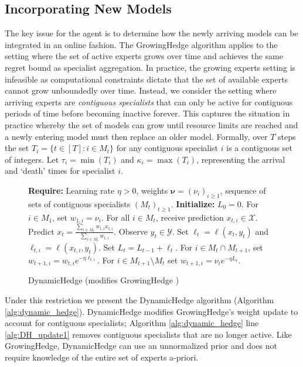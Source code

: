 \documentclass[letterpaper]{article} %
\theoremstyle{definition}
\begin{document}
\subsection{Incorporating New Models}
The key issue for the agent is to determine how the newly arriving models can be integrated in an online fashion.
The GrowingHedge algorithm \cite{MM17:growing_expert} applies to the setting where the set of active experts grows over time and achieves the same regret bound as specialist aggregation. 
In practice, the growing experts setting is infeasible as computational constraints dictate that the set of available experts cannot grow unboundedly over time. Instead, we consider the setting where arriving experts are \textit{contiguous specialists} that
can only be active for contiguous periods of time before becoming inactive forever. 
This captures the situation in practice whereby the set of models can grow until resource limits are reached and a newly entering model must then replace an older model.
Formally, over $T$ steps the set $T_i = \{t \in [T]: i \in M_t\}$ for any contiguous specialist $i$ is a contiguous set of integers. Let $\tau_i = \min(T_i)$ and $\kappa_i = \max(T_i)$, representing the arrival and `death' times for specialist $i$. 


\begin{figure}[t]
\begin{algorithm}[H]
\caption{DynamicHedge (modifies GrowingHedge \cite{MM17:growing_expert})}\label{alg:dynamic_hedge}
\begin{algorithmic}[1]
\State \textbf{Require:} Learning rate $\eta > 0$, weights $\bm{\nu} = (\nu_i)_{i \geq 1}$, sequence of sets of contiguous specialists $(M_t)_{t \geq 1}$.
\State \textbf{Initialize:} $L_0 = 0$. For $i \in M_1$, set $w_{1, i} = \nu_i$.
\State For all ${i \in M_t}$, receive prediction $x_{t, i} \in \mathcal{X}$.
\State Predict
   $ x_t = \frac{ \sum_{i \in M_t} w_{t, i} x_{t, i} }{ \sum_{i \in M_t} w_{t, i} }$.
\State Observe $y_t \in \mathcal{Y}$.
\State Set $\ell_t = \ell(x_t, y_t)$ and $\ell_{t, i} = \ell(x_{t, i}, y_t)$.
\State Set $L_t = L_{t-1} + \ell_t$.
\State For $i \in M_t \cap M_{t+1}$, set $w_{t+1, i} = w_{t, i} e^{-\eta \ell_{t, i}}$. \label{alg:DH_update1}
\State For $i \in M_{t+1} \setminus M_t$ set $w_{t+1, i} = \nu_i e^{-\eta L_t}$. \label{alg:DH_update2} %
\EndFor
\end{algorithmic}
\end{algorithm}
\end{figure}
Under this restriction we present the DynamicHedge algorithm (Algorithm \ref{alg:dynamic_hedge}).
DynamicHedge modifies GrowingHedge's weight update to account for contiguous specialists; Algorithm \ref{alg:dynamic_hedge} line \ref{alg:DH_update1} removes contiguous specialists that are no longer active.
Like GrowingHedge, DynamicHedge can use an unnormalized prior and does not require knowledge of the entire set of experts a-priori.
\end{document}
